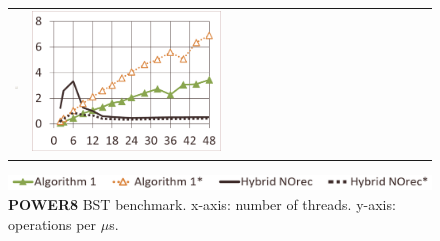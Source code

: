 \begin{figure}
\begin{minipage}{1\linewidth}
\begin{tabular}{m{0.04\linewidth}m{0.48\linewidth}m{0.48\linewidth}}
        \vspace{-8mm}\includegraphics[width=\linewidth]{figures/2021jun16/power/dsbench3_2021_pivot_exp_20i20d10000k_nrq_0.png} &
        \vspace{-8mm}\includegraphics[width=\linewidth]{figures/2021jun16/power/dsbench3_2021_pivot_exp_20i20d10000k_nrq_1.png}
        \\
    \end{tabular}
\end{minipage}
    \vspace{-2mm}
	\includegraphics[width=\linewidth]{figures/2021jun16/power/legend.png}
    \vspace{-2mm}
\caption{\textbf{POWER8} BST benchmark. x-axis: number of threads. y-axis: operations per $\mu$s.}
\label{fig-exp-power8}
\end{figure}

